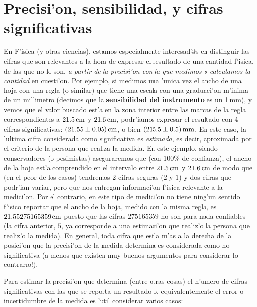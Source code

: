 \documentclass[letterpaper,11pt]{report}
\begin{document}
\section{Precisi'on, sensibilidad, y cifras significativas}

En F'isica (y otras ciencias), estamos especialmente interesad@s en distinguir las cifras que son relevantes a la hora de expresar el resultado de una cantidad f'isica, de las que no lo son, \textit{a partir de la precisi'on con la que medimos o calculamos la cantidad} en cuesti'on. Por ejemplo, si medimos una 'unica vez el ancho de una hoja con una regla (o similar) que tiene una escala con una graduaci'on m'inima de un mil'imetro (decimos que la \textbf{sensibilidad del instrumento} es un 1\,mm), y vemos que el valor buscado est'a en la zona interior entre las marcas de la regla correspondientes a $21.5\,\rm cm$ y $21.6\,\rm cm$, podr'iamos expresar el resultado con 4 cifras significativas: $(21.55\pm 0.05)\,\rm cm$, o bien $(215.5\pm 0.5)\,\rm mm$. En este caso, la 'ultima cifra considerada como significativa es \textit{estimada}, es decir, aproximada por el criterio de la persona que realiza la medida. En este ejemplo, siendo conservadores (o pesimistas) aseguraremos que (con 100\% de confianza), el ancho de la hoja est'a comprendido en el intervalo entre $21.5\,\rm cm$ y $21.6\,\rm cm$ de modo que (en el peor de los casos) tendremos 2 cifras seguras ($2$ y $1$) y dos cifras que podr'ian variar, pero que nos entregan informaci'on f'isica relevante a la medici'on. Por el contrario, en este tipo de medici'on no tiene ning'un sentido f'isico reportar que el ancho de la hoja, medido con la misma regla, es $21.55275165359\,\rm cm$ puesto que las cifras $275165359$ no son para nada confiables (la cifra anterior, $5$, ya corresponde a una estimaci'on que realiz'o la persona que realiz'o la medida). En general, toda cifra que est'a m'as a la derecha de la posici'on que la precisi'on de la medida determina es considerada como no significativa (a menos que existen muy buenos argumentos para considerar lo contrario!).

Para estimar la precisi'on que determina (entre otras cosas) el n'umero de cifras significativas con las que se reporta un resultado o, equivalentemente el error o incertidumbre de la medida es 'util considerar varios casos:
\end{document}
